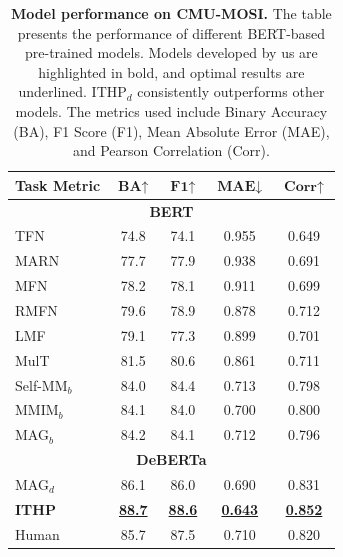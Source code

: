 \begin{table}[!htb]
\vspace{0.2 cm}
\setlength{\abovecaptionskip}{0.3 cm}
\setlength{\belowcaptionskip}{-0.3 cm} 
\renewcommand{\arraystretch}{1.26}
\centering
\setlength\tabcolsep{15.6 pt}
\begin{tabular}{@{}lcccc@{}}
    \toprule\toprule
    \textbf{Task Metric} & $\textbf{BA}{\uparrow}$ & $\textbf{F1}{\uparrow}$ & $\textbf{MAE}{\downarrow}$ & $\textbf{Corr}{\uparrow}$ \\
    \hline
    \multicolumn{5}{c}{\textbf{BERT}} \\
    \hline
    TFN \citep{zadeh2017tensor}             & 74.8 & 74.1 & 0.955 & 0.649 \\
    MARN \citep{zadeh2018multiattention}    & 77.7 & 77.9 & 0.938 & 0.691 \\
    MFN \citep{zadeh2018memory}             & 78.2 & 78.1 & 0.911 & 0.699 \\
    RMFN \citep{liang2018multimodal}        & 79.6 & 78.9 & 0.878 & 0.712 \\
    LMF \citep{liu2018efficient}            & 79.1 & 77.3 & 0.899 & 0.701 \\
    MulT \citep{tsai2019multimodal}         & 81.5 & 80.6 & 0.861 & 0.711 \\
    Self-MM$_b$ \citep{yu2021learning}          & 84.0 & 84.4 & 0.713 & 0.798 \\
    MMIM$_b$ \citep{han2021improving}           & 84.1 & 84.0 & 0.700 & 0.800 \\
    MAG$_b$ \citep{rahman2020integrating}   & 84.2 & 84.1 & 0.712 & 0.796 \\
    \hline
    \multicolumn{5}{c}{\textbf{DeBERTa}} \\
    \hline
    MAG$_d$    & 86.1 & 86.0 & 0.690 & 0.831 \\
    \textbf{ITHP} & \textbf{\uline{88.7}} & \textbf{\uline{88.6}} & \textbf{\uline{0.643}} & \textbf{\uline{0.852}} \\
    \midrule 
    Human   & 85.7 & 87.5 & 0.710 & 0.820 \\
    \bottomrule\bottomrule
\end{tabular}
\caption{\textbf{Model performance on CMU-MOSI.} The table presents the performance of different BERT-based pre-trained models. Models developed by us are highlighted in bold, and optimal results are underlined. ITHP$_d$ consistently outperforms other models. The metrics used include Binary Accuracy (BA), F1 Score (F1), Mean Absolute Error (MAE), and Pearson Correlation (Corr).}
\label{tab:SentimentAnalysisPerformance}
\end{table}